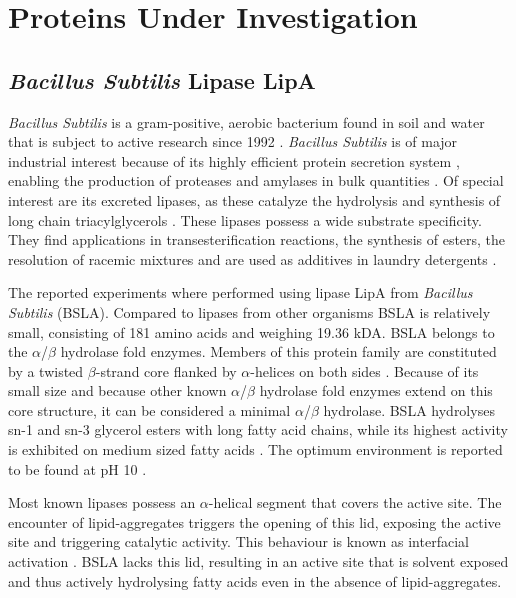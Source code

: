 \documentclass[english, a4paper, 12pt, titlepage, draft]{article}
\begin{document}

\section{Proteins Under Investigation}


\subsection{\textit{Bacillus Subtilis} Lipase LipA}

\textit{Bacillus Subtilis} is a gram-positive, aerobic bacterium found in soil and water that is subject to active research since 1992 \cite{bacillusSubtilis}.
\textit{Bacillus Subtilis} is of major industrial interest because of its highly efficient protein secretion system \cite{BSsecretion}, enabling the production of proteases and amylases in bulk quantities \cite{BSworkhorse}.
Of special interest are its excreted lipases, as these catalyze the hydrolysis and synthesis of long chain triacylglycerols \cite{BSLA_1I6W}.
These lipases possess a wide substrate specificity.
They find applications in transesterification reactions, the synthesis of esters, the resolution of racemic mixtures and are used as additives in laundry detergents \cite{BSdetergents}.

The reported experiments where performed using lipase LipA from \textit{Bacillus Subtilis} (BSLA).
Compared to lipases from other organisms BSLA is relatively small, consisting of 181 amino acids and weighing 19.36 kDA.
BSLA belongs to the $\alpha$/$\beta$ hydrolase fold enzymes.
Members of this protein family are constituted by a twisted $\beta$-strand core flanked by $\alpha$-helices on both sides \cite{alphaBetaHydrolases}.
Because of its small size and because other known $\alpha$/$\beta$ hydrolase fold enzymes extend on this core structure, it can be considered a minimal $\alpha$/$\beta$ hydrolase.
BSLA hydrolyses sn-1 and sn-3 glycerol esters with long fatty acid chains, while its highest activity is exhibited on medium sized fatty acids \cite{BSLA_1I6W}.
The optimum environment is reported to be found at pH 10 \cite{BSLA_1I6W}.

Most known lipases possess an $\alpha$-helical segment that covers the active site.
The encounter of lipid-aggregates triggers the opening of this lid, exposing the active site and triggering catalytic activity.
This behaviour is known as interfacial activation \cite{alphaBetaHydrolases}.
BSLA lacks this lid, resulting in an active site that is solvent exposed and thus actively hydrolysing fatty acids even in the absence of lipid-aggregates.
\end{document}

